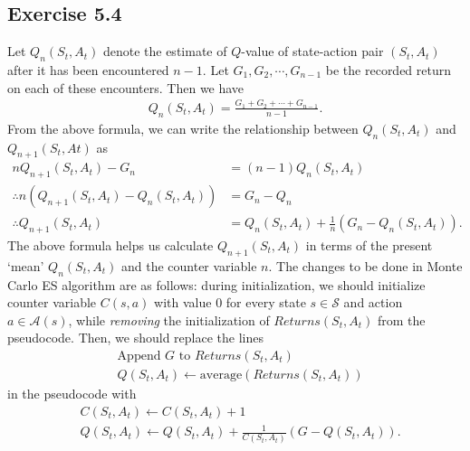 \documentclass[10pt]{article}
\begin{document}
 	\subsection*{Exercise 5.4} 
 	\label{ss:5.4}
 	Let $Q_n(S_t,A_t)$ denote the estimate of $Q$-value of state-action pair $(S_t,A_t)$ after it has been encountered $n-1$. Let $G_1,G_2,\cdots,G_{n-1}$ be the recorded return on each of these encounters. Then we have
 	\begin{align*}
 	Q_n(S_t,A_t) = \frac{ G_1+G_2+\cdots+G_{n-1}}{n-1}.
 	\end{align*}
 	From the above formula, we can write the relationship between $Q_n(S_t,A_t)$ and $Q_{n+1}(S_t,At)$ as
 	\begin{align*}
 	nQ_{n+1}(S_t,A_t) - G_n &= (n-1) Q_n(S_t,A_t)\\
 	\therefore n\left(Q_{n+1}(S_t,A_t) - Q_n(S_t,A_t)\right) &= G_n - Q_n\\
 	\therefore Q_{n+1} (S_t,A_t) &= Q_n(S_t,A_t) + \frac{1}{n}\left(G_n - Q_n(S_t,A_t)\right).
 	\end{align*}
 	The above formula helps us calculate $Q_{n+1}(S_t,A_t)$ in terms of the present `mean' $Q_n(S_t,A_t)$ and the counter variable $n$. The changes to be done in Monte Carlo ES algorithm are as follows: during initialization, we should initialize counter variable $C(s,a)$ with value $0$ for every state $s\in\mathcal{S}$ and action $a\in\mathcal{A}(s)$, while \emph{removing} the initialization of $\textit{Returns}(S_t,A_t)$ from the pseudocode. Then, we should replace the lines
 	\begin{align*}
 	&\text{Append } G \text{ to } \textit{Returns}(S_t,A_t)\\
 	&Q(S_t,A_t) \leftarrow \text{average}\left( \textit{Returns}(S_t,A_t) \right)
 	\end{align*}
 	in the pseudocode with
 	\begin{align*}
 	&C(S_t,A_t) \leftarrow C(S_t,A_t) + 1\\
 	&Q(S_t,A_t) \leftarrow Q(S_t,A_t) + \frac{1}{C(S_t,A_t)} \left( G - Q(S_t,A_t) \right).
 	\end{align*}
\end{document}
